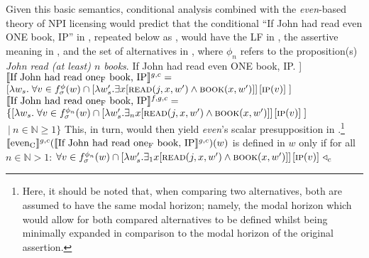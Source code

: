 \noindent Given this basic semantics,  conditional analysis combined with the \textit{even}-based theory of NPI licensing would predict that the conditional \enquote{If John had read even \MakeUppercase{one} book, IP} in , repeated below as , would have the LF in , the assertive meaning in , and the set of alternatives in , where $\phi_n$ refers to the proposition(s) \textit{John read (at least) $n$ books}.
\pex[nopreamble=true]\label{ex:ds-neutral-conditional}%
\a{} If John had read even \MakeUppercase{one} book, IP.
\a[]\phantomsection [even\textsubscript{C} [If John had read one\textsubscript{F} book IP]]
\a{} $\intension[g,c]{If John had read one\textsubscript{F} book, IP}=$\\$[\lambda w_s.\hspace{1mm}\forall v\in f^{\phi}_\sigma(w)\cap [\lambda w'_s.\exists{x}[\predicate{read}(j,x,w')\land\predicate{book}(x,w')]]\hspace{0.5mm}[\predicate{ip}(v)]\hspace{1mm}]$
\a{} $\intension[f,g,c]{If John had read one\textsubscript{F} book, IP}=$\\$\{[\lambda w_s.\hspace{1mm}\forall v\in f^{\phi_n}_\sigma(w)\cap [\lambda w'_s.\exists_n{x}[\predicate{read}(j,x,w')\land\predicate{book}(x,w')]]\hspace{0.5mm}[\predicate{ip}(v)]\hspace{1mm}]$\\\emptyfill$~|~n\in\mathbb{N}\geqslant1\}$
\xe
This, in turn, would then yield \textit{even}'s scalar presupposition in .\footnote{Here, it should be noted that, when comparing two alternatives, both are assumed to have the same modal horizon; namely, the modal horizon which would allow for both compared alternatives to be defined whilst being minimally expanded in comparison to the modal horizon of the original assertion.}
\ex{}
$\intension[g,c]{even\textsubscript{C}}(\intension[g,c]{If John had read one\textsubscript{F} book, IP})(w)$ is defined in $w$ only if for all $n\in\mathbb{N}>1$:
$\forall v\in f^{\phi_n}_\sigma(w)\cap [\lambda w'_s.\exists_1{x}[\predicate{read}(j,x,w')\land\predicate{book}(x,w')]]\hspace{0.5mm}[\predicate{ip}(v)]~\lprob_c$\\\emptyfill
